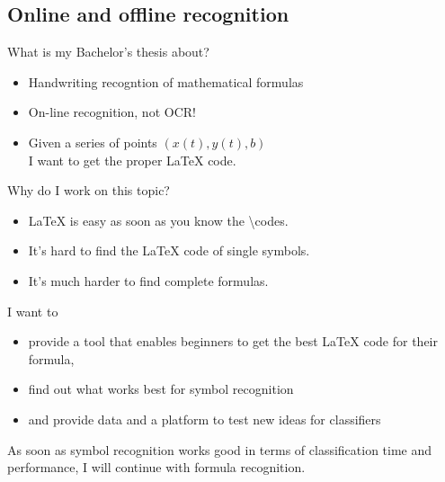 \subsection{Online and offline recognition}

\begin{frame}{What is my Bachelor's thesis about?}
    \begin{itemize}
        \item Handwriting recogntion of mathematical formulas
        \item On-line recognition, not OCR!
        \item Given a series of points $(x(t), y(t), b)$\\
              I want to get the proper \LaTeX{} code.
    \end{itemize}
\end{frame}

\begin{frame}{Why do I work on this topic?}
    \begin{itemize}
        \item \LaTeX{} is easy as soon as you know the \textbackslash{}codes.
        \item It's hard to find the \LaTeX{} code of single symbols.
        \item It's much harder to find complete formulas.
    \end{itemize}

    I want to
    \begin{itemize}
        \item provide a tool that enables beginners to get the best \LaTeX{} code
              for their formula,
        \item find out what works best for symbol recognition
        \item and provide data and a platform to test new ideas for classifiers
    \end{itemize}

    As soon as symbol recognition works good in terms of classification time and
    performance, I will continue with formula recognition.
\end{frame}